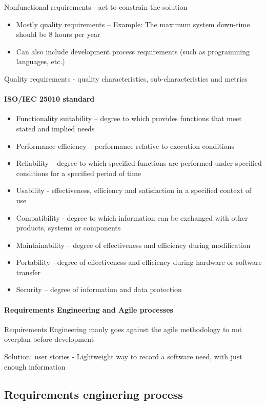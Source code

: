 \documentclass[../ESOF_notes.tex]{subfiles}
\begin{document}
Nonfunctional requirements - act to constrain the solution
\begin{itemize}
    \item Mostly quality requirements – Example: The maximum system down-time should be 8 hours per year
    \item Can also include development process requirements (such as programming languages, etc.)
\end{itemize}

Quality requirements - quality characteristics, sub-characteristics and metrics

\paragraph{ISO/IEC 25010 standard}
    \begin{itemize}
        \item Functionality suitability – degree to which provides functions that meet stated and implied needs
        \item Performance efficiency – performance relative to execution conditions
        \item Reliability – degree to which specified functions are performed under specified conditions for a specified period of time
        \item Usability - effectiveness, efficiency and satisfaction in a specified context of use
        \item Compatibility - degree to which information can be exchanged with other products, systems or components
        \item Maintainability – degree of effectiveness and efficiency during modification
        \item Portability - degree of effectiveness and efficiency during hardware or software transfer
        \item Security – degree of information and data protection
    \end{itemize}

\paragraph{Requirements Engineering and Agile processes}
Requirements Engineering manly goes against the agile methodology to not overplan before development

Solution: user stories - Lightweight way to record a software need, with just enough information

\subsection{Requirements enginering process}
\end{document}
